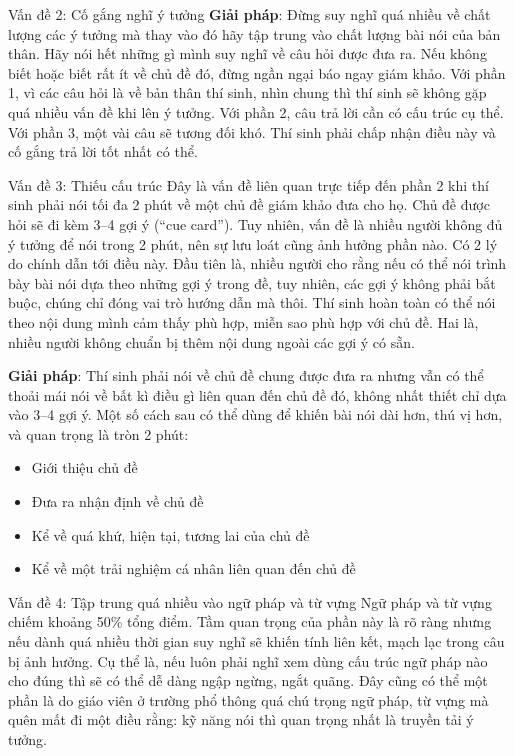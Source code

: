 \begin{multicols}{2}
\begin{qa}{Vấn đề 2: Cố gắng nghĩ ý tưởng}
\vspace{.2cm}
\textbf{Giải pháp}: Đừng suy nghĩ quá nhiều về chất lượng các ý tưởng mà thay vào đó hãy tập trung vào chất lượng bài nói của bản thân. Hãy nói hết những gì mình suy nghĩ về câu hỏi được đưa ra. Nếu không biết hoặc biết rất ít về chủ đề đó, đừng ngần ngại báo ngay giám khảo. Với phần 1, vì các câu hỏi là về bản thân thí sinh, nhìn chung thì thí sinh sẽ không gặp quá nhiều vấn đề khi lên ý tưởng. Với phần 2, câu trả lời cần có cấu trúc cụ thể. Với phần 3, một vài câu sẽ tương đối khó. Thí sinh phải chấp nhận điều này và cố gắng trả lời tốt nhất có thể.
\end{qa}

\begin{qa}{Vấn đề 3: Thiếu cấu trúc}
Đây là vấn đề liên quan trực tiếp đến phần 2 khi thí sinh phải nói tối đa 2 phút về một chủ đề giám khảo đưa cho họ. Chủ đề được hỏi sẽ đi kèm 3–4 gợi ý (“cue card”). Tuy nhiên, vấn đề là nhiều người không đủ ý tưởng để nói trong 2 phút, nên sự lưu loát cũng ảnh hưởng phần nào. Có 2 lý do chính dẫn tới điều này. Đầu tiên là, nhiều người cho rằng nếu có thể nói trình bày bài nói dựa theo những gợi ý trong đề, tuy nhiên, các gợi ý không phải bắt buộc, chúng chỉ đóng vai trò hướng dẫn mà thôi. Thí sinh hoàn toàn có thể nói theo nội dung mình cảm thấy phù hợp, miễn sao phù hợp với chủ đề. Hai là, nhiều người không chuẩn bị thêm nội dung ngoài các gợi ý có sẵn.

\vspace{.2cm}
\textbf{Giải pháp}: Thí sinh phải nói về chủ đề chung được đưa ra nhưng vẫn có thể thoải mái nói về bất kì điều gì liên quan đến chủ đề đó, không nhất thiết chỉ dựa vào 3–4 gợi ý. Một số cách sau có thể dùng để khiến bài nói dài hơn, thú vị hơn, và quan trọng là tròn 2 phút:
\begin{itemize}
    \item Giới thiệu chủ đề
    \item Đưa ra nhận định về chủ đề
    \item Kể về quá khứ, hiện tại, tương lai của chủ đề
    \item Kể về một trải nghiệm cá nhân liên quan đến chủ đề
\end{itemize}
\end{qa}

\begin{qa}{Vấn đề 4: Tập trung quá nhiều vào ngữ pháp và từ vựng}
Ngữ pháp và từ vựng chiếm khoảng 50\% tổng điểm. Tầm quan trọng của phần này là rõ ràng nhưng nếu dành quá nhiều thời gian suy nghĩ sẽ khiến tính liên kết, mạch lạc trong câu bị ảnh hưởng. Cụ thể là, nếu luôn phải nghĩ xem dùng cấu trúc ngữ pháp nào cho đúng thì sẽ có thể dễ dàng ngập ngừng, ngắt quãng. Đây cũng có thể một phần là do giáo viên ở trường phổ thông quá chú trọng ngữ pháp, từ vựng mà quên mất đi một điều rằng: kỹ năng nói thì quan trọng nhất là truyền tải ý tưởng.


\end{qa}
\end{multicols}
